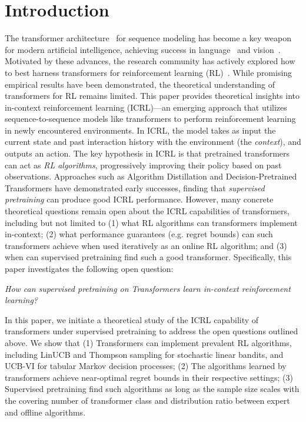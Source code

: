 \documentclass[10pt]{article}
\newcommand{\<}{\left\langle}
\renewcommand{\>}{\right\rangle}
\begin{document}
\section{Introduction}
The transformer architecture~\citep{vaswani2017attention} for sequence modeling has become a key weapon for modern artificial intelligence, achieving success in language~\citep{devlin2018bert,brown2020language,openai2023gpt} and vision~\citep{dosovitskiy2020image}. Motivated by these advances, the research community has actively explored how to best harness transformers for reinforcement learning (RL)~\citep{chen2021decision, janner2021offline, lee2022multi, reed2022generalist, laskin2022context, lee2023supervised,yang2023foundation}. While promising empirical results have been demonstrated, the theoretical understanding of transformers for RL remains limited.
This paper provides theoretical insights into in-context reinforcement learning (ICRL)---an emerging approach that utilizes sequence-to-sequence models like transformers to perform reinforcement learning in newly encountered environments. In ICRL, the model takes as input the current state and past interaction history with the environment (the \emph{context}), and outputs an action. The key hypothesis in ICRL is that pretrained transformers can act as \emph{RL algorithms}, progressively improving their policy based on past observations. Approaches such as Algorithm Distillation \citep{laskin2022context} and Decision-Pretrained Transformers \citep{lee2023supervised} have demonstrated early successes, finding that \emph{supervised pretraining} can produce good ICRL performance. However, many concrete theoretical questions remain open about the ICRL capabilities of transformers, including but not limited to (1) what RL algorithms can transformers implement in-context; (2) what performance guarantees (e.g. regret bounds) can such transformers achieve when used iteratively as an online RL algorithm; and (3) when can supervised pretraining find such a good transformer. Specifically, this paper investigates the following open question:
\begin{center}
\emph{How can supervised pretraining on Transformers learn in-context reinforcement learning?}
\end{center}
In this paper, we initiate a theoretical study of the ICRL capability of transformers under supervised pretraining to address the open questions outlined above. We show that (1) Transformers can implement prevalent RL algorithms, including LinUCB and Thompson sampling for stochastic linear bandits, and UCB-VI for tabular Markov decision processes; (2) The algorithms learned by transformers achieve near-optimal regret bounds in their respective settings; (3) Supervised pretraining find such algorithms as long as the sample size scales with the covering number of transformer class and distribution ratio between expert and offline algorithms.
\end{document}
